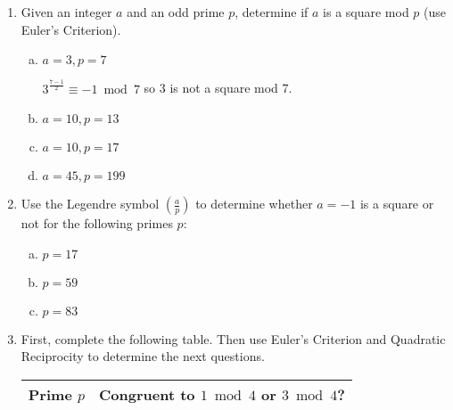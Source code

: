 \documentclass[12pt]{amsart}
\theoremstyle{plain}
\theoremstyle{definition}
\theoremstyle{remark}
\begin{document}
\begin{enumerate}[1.]
		\item Given an integer $a$ and an odd prime $p$, determine if $a$ is a square mod $p$ (use Euler's Criterion).
		\begin{enumerate}[a.]
			\item $a = 3, p = 7$
				\begin{framed}
				$3^{\frac{7-1}{2}} \equiv -1 \bmod 7$ so 3 is not a square mod 7.
				\end{framed}
			\item $a = 10, p = 13$
				\begin{framed}
				\vspace{.5in}
				\end{framed}
			\item $a = 10, p = 17$
				\begin{framed}
				\vspace{.5in}
				\end{framed}
			\item $a = 45, p = 199$
				\begin{framed}
				\vspace{.5in}
				\end{framed}
		\end{enumerate}
		\item Use the Legendre symbol $\left( \frac{a}{p}\right)$ to determine whether $a = -1$ is a square or not for the following primes $p$:
		\begin{enumerate}[a.]
			\item $p = 17$
				\begin{framed}
				\vspace{.5in}
				\end{framed}
			\newpage \item $p =  59$
				\begin{framed}
				\vspace{.5in}
				\end{framed}
			\item $p = 83$
				\begin{framed}
				\vspace{.5in}
				\end{framed}
		\end{enumerate}
		\item First, complete the following table.  Then use Euler's Criterion and Quadratic Reciprocity to determine the next questions.
			\begin{center}
			\begin{tabular}{|p{1in}|p{3in}|} \hline
			Prime $p$ & Congruent to $1 \bmod 4$ or $3 \bmod 4$?\\ \hline

\end{tabular}
\end{center}
\end{enumerate}
\end{document}
